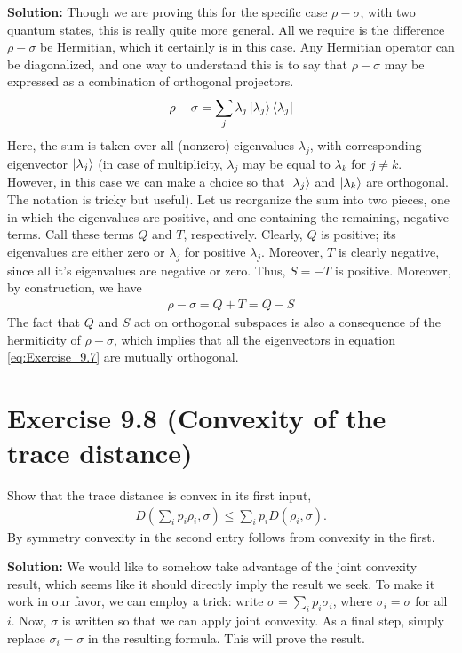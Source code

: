 \documentclass{book}
\begin{document}
    \textbf{Solution:} Though we are proving this for the specific case $\rho -\sigma$, with two quantum states, this is really quite more general. All we require is the difference $\rho - \sigma$ be Hermitian, which it certainly is in this case. Any Hermitian operator can be diagonalized, and one way to understand this is to say that $\rho - \sigma$ may be expressed as a combination of orthogonal projectors.
    \begin{align} \label{eq:Exercise_9.7}
        \rho - \sigma = \sum_j \lambda_j \ket{\lambda_j}\bra{\lambda_j}
    \end{align}
    Here, the sum is taken over all (nonzero) eigenvalues $\lambda_j$, with corresponding eigenvector $\ket{\lambda_j}$ (in case of multiplicity, $\lambda_j$ may be equal to $\lambda_k$ for $j\neq k$. However, in this case we can make a choice so that $\ket{\lambda_j}$ and $\ket{\lambda_k}$ are orthogonal. The notation is tricky but useful). Let us reorganize the sum into two pieces, one in which the eigenvalues are positive, and one containing the remaining, negative terms. Call these terms $Q$ and $T$, respectively. Clearly, $Q$ is positive; its eigenvalues are either zero or $\lambda_j$ for positive $\lambda_j$. Moreover, $T$ is clearly negative, since all it's eigenvalues are negative or zero. Thus, $S = -T$ is positive. Moreover, by construction, we have
    \begin{align}
        \rho - \sigma = Q + T = Q - S
    \end{align}
    The fact that $Q$ and $S$ act on orthogonal subspaces is also a consequence of the hermiticity of $\rho -\sigma$, which implies that all the eigenvectors in equation \eqref{eq:Exercise_9.7} are mutually orthogonal.

\section*{Exercise 9.8 (Convexity of the trace distance)} 
    Show that the trace distance is convex in its first input,
    \begin{align}
        D\left(\sum_i p_i\rho_i, \sigma\right) \leq \sum_i p_i D(\rho_i, \sigma).
    \end{align}
    By symmetry convexity in the second entry follows from convexity in the first.
    
    \textbf{Solution:} We would like to somehow take advantage of the joint convexity result, which seems like it should directly imply the result we seek. To make it work in our favor, we can employ a trick: write $\sigma = \sum_i p_i \sigma_i$, where $\sigma_i = \sigma$ for all $i$. Now, $\sigma$ is written so that we can apply joint convexity. As a final step, simply replace $\sigma_i = \sigma$ in the resulting formula. This will prove the result. 
    
\end{document}
